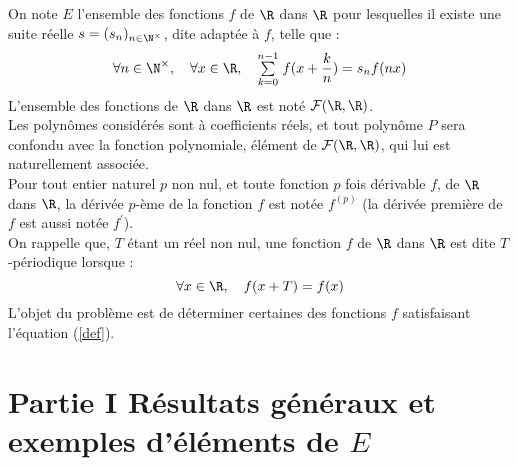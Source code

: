 \documentclass[11pt]{article}%
\begin{document}
\noindent On note $E$ l'ensemble des fonctions $f$ de $\R$ dans $\R$
pour lesquelles il existe une suite réelle $s = (s_{n})_{n\in
\N^{\times }}$, dite adaptée à $f$, telle que :
\begin{equation}
\forall n\in \N^{\times },\quad \forall x\in \R,\quad
\Sum{k = 0}{n-1}f(x + \frac{k}{n}) = s_{n}f(nx) \label{def}
\end{equation}L'ensemble des fonctions de $\R$ dans $\R$ est noté
$\mathcal{F}(\R,\R)$.\\
Les polynômes considérés sont à coefficients réels, et tout polynôme
$P$
sera confondu avec la fonction polynomiale, élément de
$\mathcal{F}(\R,\R)$, qui lui est naturellement associée.\\
Pour tout entier naturel $p$ non nul, et toute fonction $p$ fois
dérivable $f $, de $\R$ dans $\R$, la dérivée $p$-ème de la fonction
$f$
est notée $f^{(p)}$ (la dérivée première de $f$ est aussi notée
$f^{\prime }$).\\
On rappelle que, $T$ étant un réel non nul, une fonction $f$ de $\R$
dans $\R$ est dite $T$-périodique lorsque :
\[
\forall x\in \R,\quad f(x + T) = f(x)
\]
L'objet du problème est de déterminer certaines des fonctions $f$
satisfaisant l'équation (\ref{def}).

\section*{Partie I Résultats généraux et exemples d'éléments de $E$}
\end{document}
